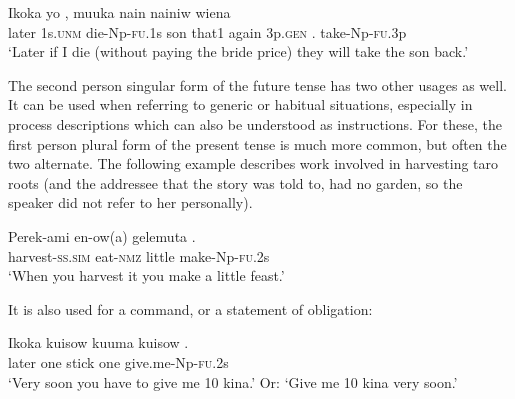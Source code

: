\ea%
\label{ex:x1641}
\gll Ikoka yo , muuka nain nainiw wiena \\
later 1s.\textsc{unm} die-Np-\textsc{fu}.1s son that1 again 3p.\textsc{gen} . take-Np-\textsc{fu}.3p\\
\glt`Later if I die (without paying the bride price) they will take the son back.'
\z

The second person singular form of the future tense has two other usages as well. It can be used when referring to generic or habitual situations, especially in process descriptions which can also be understood as instructions. For these, the first person plural form of the present tense is much more common, but often the two alternate. The following example describes work involved in harvesting taro roots (and the addressee that the story was told to, had no garden, so the speaker did not refer to her personally). 

\ea%
\label{ex:x1038}
\gll Perek-ami en-ow(a) gelemuta . \\
harvest-\textsc{ss}.\textsc{sim} eat-\textsc{nmz} little make-Np-\textsc{fu}.2s\\
\glt`When you harvest it you make a little feast.'
\z

It is also used for a command, or a statement of obligation:

\ea%
\label{ex:x1039}
\gll Ikoka kuisow kuuma kuisow . \\
later one stick one give.me-Np-\textsc{fu}.2s\\
\glt`Very soon you have to give me 10 kina.' Or: `Give me 10 kina very soon.'
\z

